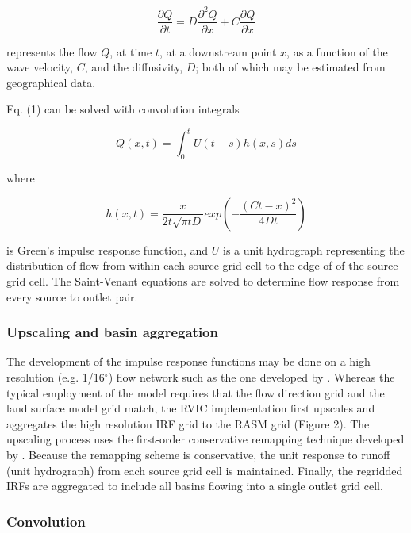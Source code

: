 \documentclass[ms, draft]{agutex}
\begin{document}
\begin{article}
 \begin{equation}
     \frac{\partial Q}{\partial t} = D \frac{\partial^2 Q}{\partial x} + C \frac{\partial Q}{\partial x}
 \end{equation}

represents the flow $Q$, at time $t$, at a downstream point $x$, as a function of the wave velocity, $C$, and the diffusivity, $D$; both of which may be estimated from geographical data.

Eq. (1) can be solved with convolution integrals

 \begin{equation}
	Q(x,t) = \int_0^t U(t-s)h(x,s)ds
 \end{equation}

where

 \begin{equation}
	h(x, t) = \frac{x}{2t\sqrt{\pi tD}}exp\left(-\frac{(Ct-x)^2}{4Dt}\right)
 \end{equation}

is Green’s impulse response function, and $U$ is a unit hydrograph representing the distribution of flow from within each source grid cell to the edge of of the source grid cell.
The Saint-Venant equations are solved to determine flow response from every source to outlet pair.

\subsubsection{Upscaling and basin aggregation}

The development of the impulse response functions may be done on a high resolution (e.g. 1/16$^{\circ}$) flow network such as the one developed by \citet{Wu_2011}.
Whereas the typical employment of the \citet{Lohmann_1996} model requires that the flow direction grid and the land surface model grid match, the RVIC implementation first upscales and aggregates the high resolution IRF grid to the RASM grid (Figure 2).
The upscaling process uses the first-order conservative remapping technique developed by \cite{Jones_1999}.
Because the remapping scheme is conservative, the unit response to runoff (unit hydrograph) from each source grid cell is maintained.
Finally, the regridded IRFs are aggregated to include all basins flowing into a single outlet grid cell.

\subsubsection{Convolution}


\end{article}
\end{document}
